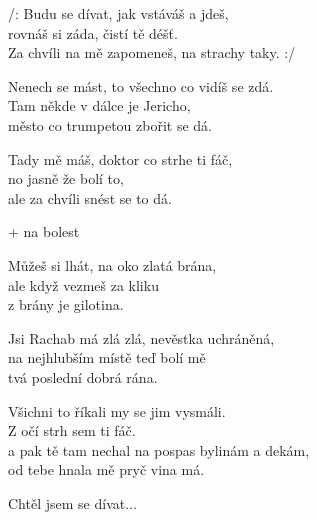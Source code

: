 
\cho{}
/: Budu se dívat, jak vstáváš a jdeš,\\
rovnáš si záda, čistí tě déšť.\\
Za chvíli na mě zapomeneš, na strachy taky.  :/

\ve{}
Nenech se mást, to všechno co vidíš se zdá.\\
Tam někde v dálce je Jericho,\\
město co trumpetou zbořit se dá.

Tady mě máš, doktor co strhe ti fáč,\\
no jasně že bolí to,\\
ale za chvíli snést se to dá. 

\cho{}
+ na bolest 

\ve{}
Můžeš si lhát, na oko zlatá brána,\\
ale když vezmeš za kliku\\
z brány je gilotina. 

Jsi Rachab má zlá zlá, nevěstka uchráněná,\\
na nejhlubším místě teď bolí mě\\
tvá poslední dobrá rána. 

\cho{}

\ve{}
Všichni to říkali my se jim vysmáli.\\
Z očí strh sem ti fáč.\\
a pak tě tam nechal na pospas bylinám a dekám,\\
od tebe hnala mě pryč vina má.

\cho{}
Chtěl jsem se dívat...

\esong